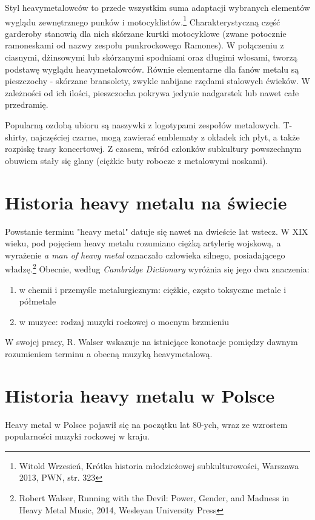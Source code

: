\documentclass[12pt, a4paper, titlepage]{report}
\begin{document}
Styl heavymetalowców to przede wszystkim suma adaptacji wybranych elementów wyglądu zewnętrznego punków i motocyklistów.\footnote{Witold Wrzesień, Krótka historia młodzieżowej subkulturowości, Warszawa 2013, PWN, \break str. 323} Charakterystyczną \break część garderoby stanowią dla nich skórzane kurtki motocyklowe (zwane potocznie ramoneskami od nazwy zespołu punkrockowego Ramones). W połączeniu z ciasnymi, dżinsowymi lub skórzanymi spodniami oraz długimi włosami, tworzą podstawę wyglądu heavymetalowców. Równie elementarne dla fanów metalu są pieszczochy - skórzane bransolety, zwykle nabijane rzędami stalowych ćwieków. W zależności od ich ilości, pieszczocha pokrywa jedynie nadgarstek lub nawet całe przedramię. 

Popularną ozdobą ubioru są naszywki z logotypami zespołów metalowych. T-shirty, najczęściej czarne, mogą zawierać emblematy z okładek ich płyt\footnotemark[\value{footnote}], a także rozpiskę trasy koncertowej. %
Z czasem, wśród członków subkultury powszechnym obuwiem stały się glany (ciężkie buty robocze z metalowymi noskami). 

\section{Historia heavy metalu na świecie}
Powstanie terminu "heavy metal" datuje się nawet na dwieście lat wstecz. W XIX wieku, pod pojęciem heavy metalu rozumiano ciężką artylerię wojskową, a wyrażenie \textit{a man of heavy metal} oznaczało człowieka silnego, posiadającego władzę.\footnote{Robert Walser, Running with the Devil: Power, Gender, and Madness in Heavy Metal Music, 2014, Wesleyan University Press}  Obecnie, według \textit{Cambridge Dictionary} wyróżnia się jego dwa znaczenia: 
\begin{enumerate}
\item w chemii i przemyśle metalurgicznym: ciężkie, często toksyczne metale  i półmetale
\item w muzyce: rodzaj muzyki rockowej o mocnym brzmieniu
\end{enumerate}

W swojej pracy, R. Walser wskazuje na istniejące konotacje pomiędzy dawnym rozumieniem terminu a obecną muzyką heavymetalową. 

\section{Historia heavy metalu w Polsce}
Heavy metal w Polsce pojawił się na początku lat 80-ych, wraz ze wzrostem popularności muzyki rockowej w kraju. %
\end{document}

